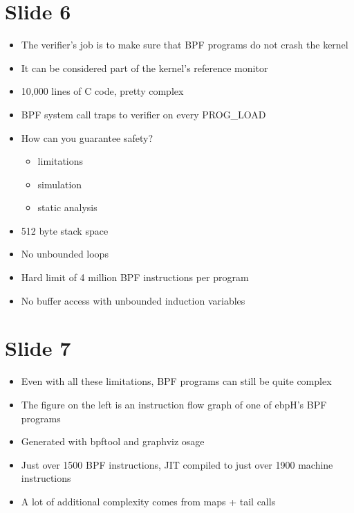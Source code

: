 \documentclass[
  12pt]{findlay}
\providecommand{\tightlist}{\setlength{\itemsep}{0pt}\setlength{\parskip}{0pt}}
\begin{document}
\hypertarget{slide-6}{%
\section{Slide 6}\label{slide-6}}

\begin{itemize}
\tightlist
\item
  The verifier's job is to make sure that BPF programs do not crash the
  kernel
\item
  It can be considered part of the kernel's reference monitor
\item
  10,000 lines of C code, pretty complex
\item
  BPF system call traps to verifier on every PROG\_LOAD
\item
  How can you guarantee safety?

  \begin{itemize}
  \tightlist
  \item
    limitations
  \item
    simulation
  \item
    static analysis
  \end{itemize}
\item
  512 byte stack space
\item
  No unbounded loops
\item
  Hard limit of 4 million BPF instructions per program
\item
  No buffer access with unbounded induction variables
\end{itemize}

\hypertarget{slide-7}{%
\section{Slide 7}\label{slide-7}}

\begin{itemize}
\tightlist
\item
  Even with all these limitations, BPF programs can still be quite
  complex
\item
  The figure on the left is an instruction flow graph of one of ebpH's
  BPF programs
\item
  Generated with bpftool and graphviz osage
\item
  Just over 1500 BPF instructions, JIT compiled to just over 1900
  machine instructions
\item
  A lot of additional complexity comes from maps + tail calls
\end{itemize}
\end{document}
